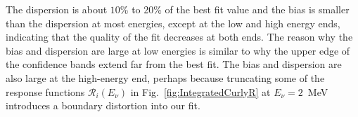 \documentclass[a4paper,11pt]{article}
\renewcommand\({\left(}
\renewcommand\){\right)}
\renewcommand\[{\left[}
\renewcommand\]{\right]}
\newcommand{\GG}[1]{{\color[cmyk]{1,0.5,0,0}#1}}%
\theoremstyle{definition}
\newcommand{\mc}{\mathcal}
\begin{document}
The dispersion is about  $10$\% to 20\% of the best fit value and the bias is smaller than the dispersion at most energies, except at the low and high energy ends, indicating that the quality of the fit decreases at both ends.
The reason why the bias and dispersion are large at low energies is similar to why the upper edge of the confidence bands extend far from the best fit. The bias and dispersion are also large at the high-energy end, perhaps because truncating some of the response functions $\mc R_i(E_\nu)$ 
 in Fig.~\ref{fig:IntegratedCurlyR} at $E_\nu =2$~MeV  \GG{introduces a boundary distortion into our fit}. %
 
\end{document}

